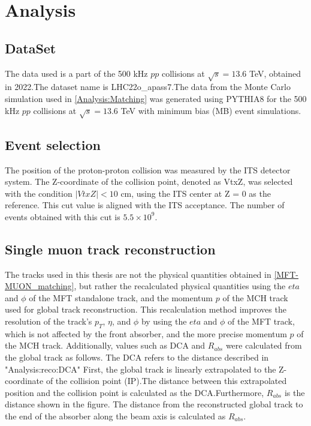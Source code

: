 \newpage
\clearpage
\section{Analysis}
\label{Analysis}
    \subsection{DataSet}
    \label{DataSet}
        The data used is a part of the 500 kHz $pp$ collisions at $\sqrt{s}=13.6$ TeV, obtained in 2022.\@ The dataset name is LHC22o\_apass7.\@ The data from the Monte Carlo simulation used in \ref{Analysis:Matching} was generated using PYTHIA8 for the 500 kHz $pp$ collisions at $\sqrt{s}=13.6$ TeV with minimum bias (MB) event simulations.
        
    \subsection{Event selection}
    \label{Event_selection}
        The position of the proton-proton collision was measured by the ITS detector system. The Z-coordinate of the collision point, denoted as VtxZ, was selected with the condition $|VtxZ| < 10$ cm, using the ITS center at Z = 0 as the reference. This cut value is aligned with the ITS acceptance. The number of events obtained with this cut is $5.5 \times 10^9$.\@

    \subsection{Single muon track reconstruction}
    \label{Single_reco}
        The tracks used in this thesis are not the physical quantities obtained in \ref{MFT-MUON_matching}, but rather the recalculated physical quantities using the $eta$ and $\phi$ of the MFT standalone track, and the momentum $p$ of the MCH track used for global track reconstruction. This recalculation method improves the resolution of the track's $p_T$, $\eta$, and $\phi$ by using the $eta$ and $\phi$ of the MFT track, which is not affected by the front absorber, and the more precise momentum $p$ of the MCH track. Additionally, values such as DCA and $R_{abs}$ were calculated from the global track as follows. The DCA refers to the distance described in "Analysis:reco:DCA" First, the global track is linearly extrapolated to the Z-coordinate of the collision point (IP).\@ The distance between this extrapolated position and the collision point is calculated as the DCA.\@ Furthermore, $R_{abs}$ is the distance shown in the figure. The distance from the reconstructed global track to the end of the absorber along the beam axis is calculated as $R_{abs}$.\@

